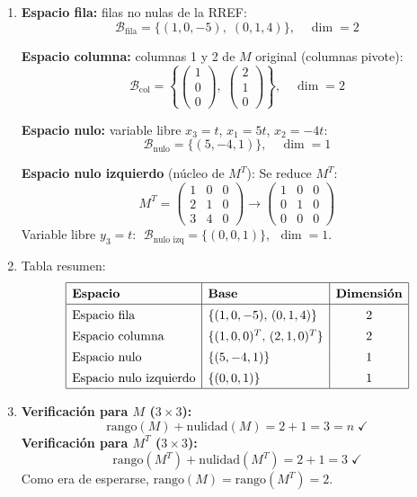 \documentclass[12pt,letterpaper]{article}
\begin{document}
\begin{enumerate}
\begin{enumerate}

    \item \textbf{Espacio fila:} filas no nulas de la RREF:
    \[
    \mathcal{B}_{\text{fila}} = \{(1,0,-5),\;(0,1,4)\}, \quad \dim = 2
    \]

    \textbf{Espacio columna:} columnas 1 y 2 de $M$ original (columnas pivote):
    \[
    \mathcal{B}_{\text{col}} = \left\{\begin{pmatrix}1\\0\\0\end{pmatrix},\;\begin{pmatrix}2\\1\\0\end{pmatrix}\right\}, \quad \dim = 2
    \]

    \textbf{Espacio nulo:} variable libre $x_3 = t$, $x_1 = 5t$, $x_2 = -4t$:
    \[
    \mathcal{B}_{\text{nulo}} = \{(5,-4,1)\}, \quad \dim = 1
    \]

    \textbf{Espacio nulo izquierdo} (núcleo de $M^T$): Se reduce $M^T$:
    \[
    M^T = \begin{pmatrix}1&0&0\\2&1&0\\3&4&0\end{pmatrix}
    \longrightarrow
    \begin{pmatrix}1&0&0\\0&1&0\\0&0&0\end{pmatrix}
    \]
    Variable libre $y_3 = t$: $\;\mathcal{B}_{\text{nulo izq}} = \{(0,0,1)\}$, $\;\dim = 1$.

    \item Tabla resumen:
    \[
    \renewcommand{\arraystretch}{1.4}
    \begin{array}{|l|l|c|}
    \hline
    \textbf{Espacio} & \textbf{Base} & \textbf{Dimensión} \\
    \hline
    \text{Espacio fila} & \{(1,0,-5),\,(0,1,4)\} & 2 \\
    \text{Espacio columna} & \{(1,0,0)^T,\,(2,1,0)^T\} & 2 \\
    \text{Espacio nulo} & \{(5,-4,1)\} & 1 \\
    \text{Espacio nulo izquierdo} & \{(0,0,1)\} & 1 \\
    \hline
    \end{array}
    \]

    \item \textbf{Verificación para $M$ ($3\times 3$):}
    \[
    \text{rango}(M) + \text{nulidad}(M) = 2 + 1 = 3 = n \;\checkmark
    \]
    \textbf{Verificación para $M^T$ ($3\times 3$):}
    \[
    \text{rango}(M^T) + \text{nulidad}(M^T) = 2 + 1 = 3 \;\checkmark
    \]
    Como era de esperarse, $\text{rango}(M)=\text{rango}(M^T)=2$.

\end{enumerate}

\end{enumerate}
\end{document}
